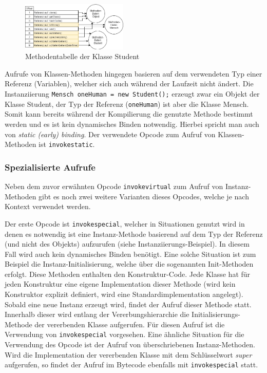 \documentclass[conference]{IEEEtran}
\begin{document}
\begin{figure}[htbp] 
  \centering
     \includegraphics[width=0.45\textwidth]{Grafiken/MethodenTabelleAusHierarchie.png}
  \caption{Methodentabelle der Klasse Student}
  \label{fig:methodenTabelleUmlHierachie}
\end{figure}

Aufrufe von Klassen-Methoden hingegen basieren auf dem verwendeten Typ einer Referenz (Variablen), welcher sich auch während der Laufzeit nicht ändert. Die Instanziierung \verb|Mensch oneHuman = new Student();| erzeugt zwar ein Objekt der Klasse Student, der Typ der Referenz (\verb|oneHuman|) ist aber die Klasse Mensch. Somit kann bereits während der Kompilierung die genutzte Methode bestimmt werden und es ist kein dynamisches Binden notwendig. Hierbei spricht man auch von \textit{static (early) binding}. Der verwendete Opcode zum Aufruf von Klassen-Methoden ist \verb|invokestatic|. \cite{Venners.1997}

\subsubsection{Spezialisierte Aufrufe}
Neben dem zuvor erwähnten Opcode \verb|invokevirtual| zum Aufruf von Instanz-Methoden gibt es noch zwei weitere Varianten dieses Opcodes, welche je nach Kontext verwendet werden. 

Der erste Opcode ist \verb|invokespecial|, welcher in Situationen genutzt wird in denen es notwendig ist eine Instanz-Methode basierend auf dem Typ der Referenz (und nicht des Objekts) aufzurufen (siehe Instanziierungs-Beispiel). In diesem Fall wird auch kein dynamisches Binden benötigt. Eine solche Situation ist zum Beispiel die Instanz-Initialisierung, welche über die sogenannten Init-Methoden erfolgt. Diese Methoden enthalten den Konstruktur-Code. Jede Klasse hat für jeden Konstruktur eine eigene Implementation dieser Methode (wird kein Konstruktor explizit definiert, wird eine Standardimplementation angelegt). Sobald eine neue Instanz erzeugt wird, findet der Aufruf dieser Methode statt. Innerhalb dieser wird entlang der Vererbungshierarchie die Initialisierungs-Methode der vererbenden Klasse aufgerufen. Für diesen Aufruf ist die Verwendung von \verb|invokespecial| vorgesehen. Eine ähnliche Situation für die Verwendung des Opcode ist der Aufruf von überschriebenen Instanz-Methoden. Wird die Implementation der vererbenden Klasse mit dem Schlüsselwort \textit{super} aufgerufen, so findet der Aufruf im Bytecode ebenfalls mit \verb|invokespecial| statt.
\end{document}

